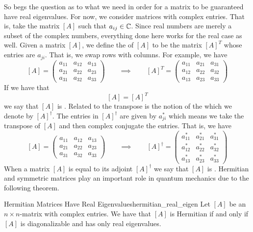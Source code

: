             So begs the question as to what we need in order for a matrix to be guaranteed have real eigenvalues.  For now, we consider matrices with complex entries.  That is, take the matrix $[A]$ such that $a_{ij}\in \mathbb{C}$. Since real numbers are merely a subset of the complex numbers, everything done here works for the real case as well.  Given a matrix $[A]$, we define the  of $[A]$   to be the matrix $[A]^T$ whose entries are $a_{ji}$. That is, we swap rows with columns.  For example, we have
            \[
            [A] = \begin{pmatrix} a_{11} & a_{12} & a_{13} \\ a_{21} & a_{22} & a_{23} \\ a_{31} & a_{32} & a_{33} \end{pmatrix} \qquad \implies \qquad [A]^T = \begin{pmatrix} a_{11} & a_{21} & a_{31} \\ a_{12} & a_{22} & a_{32} \\ a_{13} & a_{23} & a_{33} \end{pmatrix} 
            \]
            If we have that
            \[
            [A]=[A]^T
            \]
            we say that $[A]$ is . Related to the transpose is the notion of the  which we denote by $[A]^\dagger$.  The entries in $[A]^\dagger$ are given by $a_{ji}^*$ which means we take the transpose of $[A]$ and then complex conjugate the entries. That is, we have
            \[
                [A] = \begin{pmatrix} a_{11} & a_{12} & a_{13} \\ a_{21} & a_{22} & a_{23} \\ a_{31} & a_{32} & a_{33} \end{pmatrix} \qquad \implies \qquad [A]^\dagger = \begin{pmatrix} a_{11}^* & a_{21}^* & a_{31}^* \\ a_{12}^* & a_{22}^* & a_{32}^* \\ a_{13}^* & a_{23}^* & a_{33}^* \end{pmatrix}
            \]
            When a matrix $[A]$ is equal to its adjoint $[A]^\dagger$ we say that $[A]$ is .  Hermitian and symmetric matrices play an important role in quantum mechanics due to the following theorem.  
            
            \begin{thm}{Hermitian Matrices Have Real Eigenvalues}{hermitian_real_eigen}
                Let $[A]$ be an $n\times n$-matrix with complex entries. We have that $[A]$ is Hermitian if and only if $[A]$ is diagonalizable and has only real eigenvalues.
            \end{thm}
            
